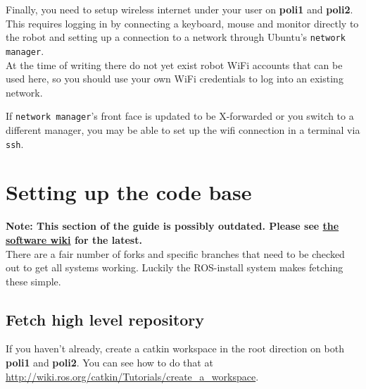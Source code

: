 Finally, you need to setup wireless internet under your user on \textbf{poli1} and \textbf{poli2}. 
This requires logging in by connecting a keyboard, mouse and monitor directly to the robot and setting up a connection to a network through Ubuntu's \texttt{network manager}. \\

At the time of writing there do not yet exist robot WiFi accounts that can be used here, so you should use your own WiFi credentials to log into an existing network.

If \texttt{network manager}'s front face is updated to be X-forwarded or you switch to a different manager, you may be able to set up the wifi connection in a terminal via \texttt{ssh}.


\section{Setting up the code base}
\textbf{Note: This section of the guide is possibly outdated. Please see \href{https://github.com/si-machines/poli2/wiki}{the software wiki} for the latest.} \\

There are a fair number of forks and specific branches that need to be checked out to get all systems working.
Luckily the ROS-install system makes fetching these simple.

\subsection{Fetch high level repository}
If you haven't already, create a catkin workspace in the root direction on both \textbf{poli1} and \textbf{poli2}. You can see how to do that at \\
\href{http://wiki.ros.org/catkin/Tutorials/create_a_workspace}{http://wiki.ros.org/catkin/Tutorials/create\_a\_workspace}.

